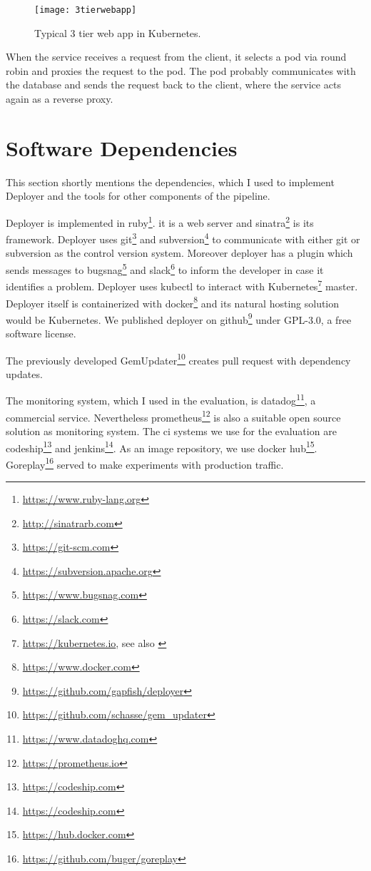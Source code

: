 \begin{figure}[htbp]
  \centering
  \texttt{[image: 3tierwebapp]}
  \caption[3tierwebapp]{Typical 3 tier web app in Kubernetes.}
  \label{fig:3tierwebapp}
\end{figure}

When the service receives a request from the client, it selects a pod via round robin and
proxies the request to the pod. The pod probably communicates with the database and sends
the request back to the client, where the service acts again as a reverse proxy.

\section{Software Dependencies}

This section shortly mentions the dependencies, which I used to implement Deployer and the
tools for other components of the pipeline.

Deployer is implemented in ruby\footnote{\url{https://www.ruby-lang.org}}. it is a
web server and sinatra\footnote{\url{http://sinatrarb.com}} is its framework. Deployer uses
git\footnote{\url{https://git-scm.com}} and
subversion\footnote{\url{https://subversion.apache.org}} to communicate with either git or
subversion as the control version system. Moreover deployer has a plugin which sends
messages to bugsnag\footnote{\url{https://www.bugsnag.com}} and
slack\footnote{\url{https://slack.com}} to inform the developer in case it identifies a
problem. Deployer uses kubectl to interact with
Kubernetes\footnote{\url{https://kubernetes.io}, see also
  \cite{kubernetes_architecture,kubernetes_architecture2}} master. Deployer itself is
containerized with docker\footnote{\url{https://www.docker.com}} and its natural hosting
solution would be Kubernetes. We published deployer on
github\footnote{\url{https://github.com/gapfish/deployer}} under GPL-3.0, a free software
license.

The previously developed GemUpdater\footnote{\url{https://github.com/schasse/gem_updater}}
creates pull request with dependency updates.

The monitoring system, which I used in the evaluation, is
datadog\footnote{\url{https://www.datadoghq.com}}, a commercial service. Nevertheless
prometheus\footnote{\url{https://prometheus.io}} is also a suitable open source solution
as monitoring system. The \gls{ci} systems we use for the evaluation are
codeship\footnote{\url{https://codeship.com}} and
jenkins\footnote{\url{https://codeship.com}}. As an image repository, we use docker
hub\footnote{\url{https://hub.docker.com}}. Goreplay\footnote{\url{https://github.com/buger/goreplay}}
served to make experiments with production traffic.

